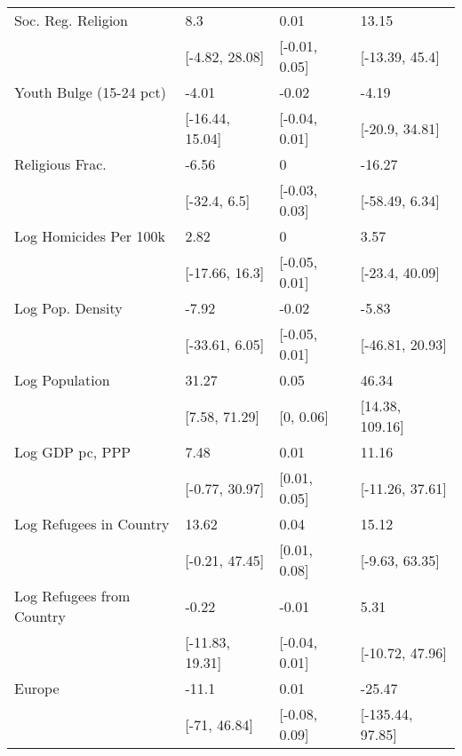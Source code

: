 \begin{table}[ht]
\begin{tabular}{llll}
  Soc. Reg. Religion & 8.3 & 0.01 & 13.15 \\ 
   & [-4.82, 28.08] & [-0.01, 0.05] & [-13.39, 45.4] \\ 
  Youth Bulge (15-24 pct) & -4.01 & -0.02 & -4.19 \\ 
   & [-16.44, 15.04] & [-0.04, 0.01] & [-20.9, 34.81] \\ 
  Religious Frac. & -6.56 & 0 & -16.27 \\ 
   & [-32.4, 6.5] & [-0.03, 0.03] & [-58.49, 6.34] \\ 
  Log Homicides Per 100k & 2.82 & 0 & 3.57 \\ 
   & [-17.66, 16.3] & [-0.05, 0.01] & [-23.4, 40.09] \\ 
  Log Pop. Density & -7.92 & -0.02 & -5.83 \\ 
   & [-33.61, 6.05] & [-0.05, 0.01] & [-46.81, 20.93] \\ 
  Log Population & 31.27 & 0.05 & 46.34 \\ 
   & [7.58, 71.29] & [0, 0.06] & [14.38, 109.16] \\ 
  Log GDP pc, PPP & 7.48 & 0.01 & 11.16 \\ 
   & [-0.77, 30.97] & [0.01, 0.05] & [-11.26, 37.61] \\ 
  Log Refugees in Country & 13.62 & 0.04 & 15.12 \\ 
   & [-0.21, 47.45] & [0.01, 0.08] & [-9.63, 63.35] \\ 
  Log Refugees from Country & -0.22 & -0.01 & 5.31 \\ 
   & [-11.83, 19.31] & [-0.04, 0.01] & [-10.72, 47.96] \\ 
  Europe & -11.1 & 0.01 & -25.47 \\ 
   & [-71, 46.84] & [-0.08, 0.09] & [-135.44, 97.85] \\ 
   \hline
\end{tabular}
\end{table}
